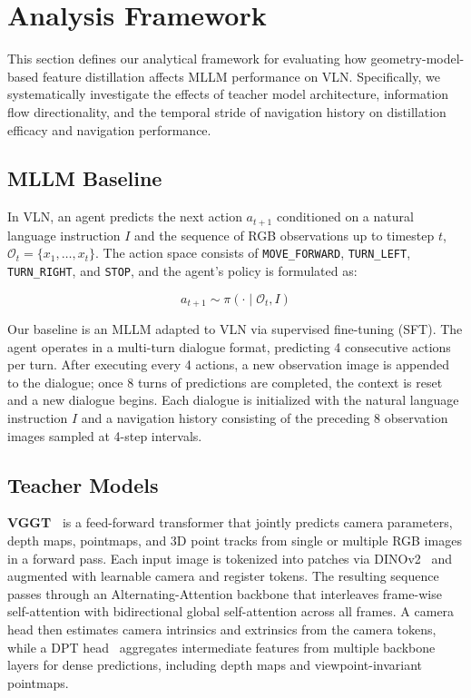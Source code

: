 \chapter{Analysis Framework}
\label{ch:framework}

This section defines our analytical framework for evaluating how geometry-model-based feature distillation affects MLLM performance on VLN. Specifically, we systematically investigate the effects of teacher model architecture, information flow directionality, and the temporal stride of navigation history on distillation efficacy and navigation performance.

\section{MLLM Baseline}
\label{sec:mllm_baseline}

In VLN, an agent predicts the next action $a_{t+1}$ conditioned on a natural language instruction $I$ and the sequence of RGB observations up to timestep $t$, $\mathcal{O}_t = \{x_1, \dots, x_t\}$. The action space consists of \texttt{MOVE\_FORWARD}, \texttt{TURN\_LEFT}, \texttt{TURN\_RIGHT}, and \texttt{STOP}, and the agent's policy is formulated as:

\[
a_{t+1} \sim \pi(\cdot \mid \mathcal{O}_t, I)
\]

Our baseline is an MLLM adapted to VLN via supervised fine-tuning (SFT). The agent operates in a multi-turn dialogue format, predicting 4 consecutive actions per turn. After executing every 4 actions, a new observation image is appended to the dialogue; once 8 turns of predictions are completed, the context is reset and a new dialogue begins. Each dialogue is initialized with the natural language instruction $I$ and a navigation history consisting of the preceding 8 observation images sampled at 4-step intervals.

\section{Teacher Models}
\label{sec:teacher_models}

\textbf{VGGT~\cite{wang2025vggt}} is a feed-forward transformer that jointly predicts camera parameters, depth maps, pointmaps, and 3D point tracks from single or multiple RGB images in a forward pass. Each input image is tokenized into patches via DINOv2~\cite{oquab2024dinov2} and augmented with learnable camera and register tokens. The resulting sequence passes through an Alternating-Attention backbone that interleaves frame-wise self-attention with bidirectional global self-attention across all frames. A camera head then estimates camera intrinsics and extrinsics from the camera tokens, while a DPT head~\cite{ranftl2021vision} aggregates intermediate features from multiple backbone layers for dense predictions, including depth maps and viewpoint-invariant pointmaps.

